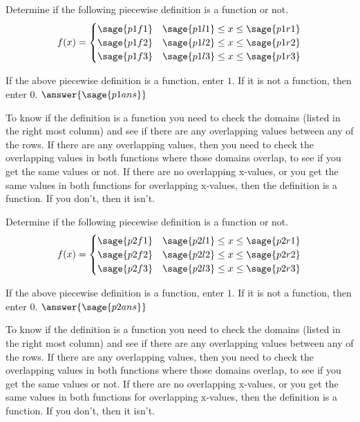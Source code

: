 \documentclass{ximera}
\begin{document}
\begin{problem}
    Determine if the following piecewise definition is a function or not. 
    \[
        f(x) =
            \begin{cases}
                \sage{p1f1}     & \sage{p1l1}\leq x \leq \sage{p1r1} \\
                \sage{p1f2}     & \sage{p1l2} \leq x \leq \sage{p1r2} \\
                \sage{p1f3}     & \sage{p1l3} \leq x \leq \sage{p1r3}
            \end{cases}
    \]
    
    If the above piecewise definition is a function, enter $1$. If it is not a function, then enter $0$.
    $\answer{\sage{p1ans}}$
    \begin{feedback}
        To know if the definition is a function you need to check the domains (listed in the right most column) and see if there are any overlapping values between any of the rows. If there are any overlapping values, then you need to check the overlapping values in both functions where those domains overlap, to see if you get the same values or not. If there are no overlapping x-values, or you get the same values in both functions for overlapping x-values, then the definition is a function. If you don't, then it isn't.
    \end{feedback}
    
\end{problem}





\begin{problem}
    Determine if the following piecewise definition is a function or not. 
    \[
        f(x) =
            \begin{cases}
                \sage{p2f1}     & \sage{p2l1}\leq x \leq \sage{p2r1} \\
                \sage{p2f2}     & \sage{p2l2} \leq x \leq \sage{p2r2} \\
                \sage{p2f3}     & \sage{p2l3} \leq x \leq \sage{p2r3}
            \end{cases}
    \]
    
    If the above piecewise definition is a function, enter $1$. If it is not a function, then enter $0$.
    $\answer{\sage{p2ans}}$
    \begin{feedback}
        To know if the definition is a function you need to check the domains (listed in the right most column) and see if there are any overlapping values between any of the rows. If there are any overlapping values, then you need to check the overlapping values in both functions where those domains overlap, to see if you get the same values or not. If there are no overlapping x-values, or you get the same values in both functions for overlapping x-values, then the definition is a function. If you don't, then it isn't.
    \end{feedback}
    
\end{problem}
\end{document}
